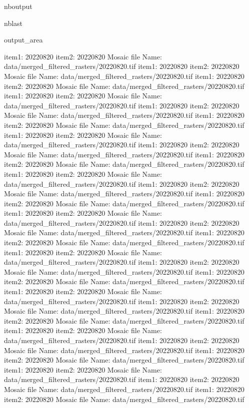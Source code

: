 \documentclass[letterpaper,10pt]{sphinxmanual}
\begin{document}
\begin{sphinxuseclass}{nboutput}
\begin{sphinxuseclass}{nblast}
{\begin{sphinxuseclass}{output_area}
\begin{sphinxuseclass}{}
\begin{sphinxVerbatim}[commandchars=\\\{\}]
item1:  20220820
item2:  20220820
Mosaic file Name:  data/merged\_filtered\_rasters/20220820.tif
item1:  20220820
item2:  20220820
Mosaic file Name:  data/merged\_filtered\_rasters/20220820.tif
item1:  20220820
item2:  20220820
Mosaic file Name:  data/merged\_filtered\_rasters/20220820.tif
item1:  20220820
item2:  20220820
Mosaic file Name:  data/merged\_filtered\_rasters/20220820.tif
item1:  20220820
item2:  20220820
Mosaic file Name:  data/merged\_filtered\_rasters/20220820.tif
item1:  20220820
item2:  20220820
Mosaic file Name:  data/merged\_filtered\_rasters/20220820.tif
item1:  20220820
item2:  20220820
Mosaic file Name:  data/merged\_filtered\_rasters/20220820.tif
item1:  20220820
item2:  20220820
Mosaic file Name:  data/merged\_filtered\_rasters/20220820.tif
item1:  20220820
item2:  20220820
Mosaic file Name:  data/merged\_filtered\_rasters/20220820.tif
item1:  20220820
item2:  20220820
Mosaic file Name:  data/merged\_filtered\_rasters/20220820.tif
item1:  20220820
item2:  20220820
Mosaic file Name:  data/merged\_filtered\_rasters/20220820.tif
item1:  20220820
item2:  20220820
Mosaic file Name:  data/merged\_filtered\_rasters/20220820.tif
item1:  20220820
item2:  20220820
Mosaic file Name:  data/merged\_filtered\_rasters/20220820.tif
item1:  20220820
item2:  20220820
Mosaic file Name:  data/merged\_filtered\_rasters/20220820.tif
item1:  20220820
item2:  20220820
Mosaic file Name:  data/merged\_filtered\_rasters/20220820.tif
item1:  20220820
item2:  20220820
Mosaic file Name:  data/merged\_filtered\_rasters/20220820.tif
item1:  20220820
item2:  20220820
Mosaic file Name:  data/merged\_filtered\_rasters/20220820.tif
item1:  20220820
item2:  20220820
Mosaic file Name:  data/merged\_filtered\_rasters/20220820.tif
item1:  20220820
item2:  20220820
Mosaic file Name:  data/merged\_filtered\_rasters/20220820.tif
item1:  20220820
item2:  20220820
Mosaic file Name:  data/merged\_filtered\_rasters/20220820.tif
item1:  20220820
item2:  20220820
Mosaic file Name:  data/merged\_filtered\_rasters/20220820.tif
item1:  20220820
item2:  20220820
Mosaic file Name:  data/merged\_filtered\_rasters/20220820.tif
item1:  20220820
item2:  20220820
Mosaic file Name:  data/merged\_filtered\_rasters/20220820.tif
item1:  20220820
item2:  20220820
Mosaic file Name:  data/merged\_filtered\_rasters/20220820.tif
item1:  20220820
item2:  20220820
Mosaic file Name:  data/merged\_filtered\_rasters/20220820.tif
item1:  20220820
item2:  20220820
Mosaic file Name:  data/merged\_filtered\_rasters/20220820.tif
item1:  20220820
item2:  20220820
Mosaic file Name:  data/merged\_filtered\_rasters/20220820.tif

\end{sphinxVerbatim}
\end{sphinxuseclass}
\end{sphinxuseclass}}
\end{sphinxuseclass}
\end{sphinxuseclass}
\end{document}
